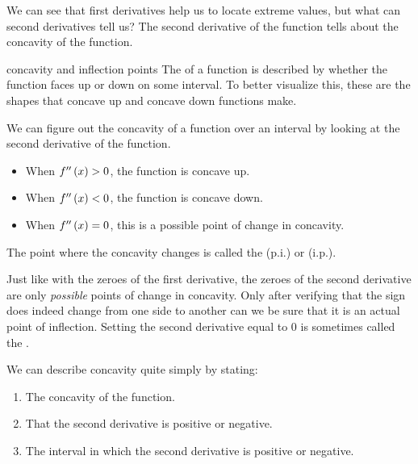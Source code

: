 We can see that first derivatives help us to locate extreme values, but what can second derivatives tell us? The second derivative of the function tells about the concavity of the function.

\begin{definition}{concavity and inflection points}
    The  of a function is described by whether the function faces up or down on some interval. To better visualize this, these are the shapes that concave up and concave down functions make.
    
    \begin{figure}[H]
        \centering
        
    \end{figure}
    
    We can figure out the concavity of a function over an interval by looking at the second derivative of the function.
    
    \begin{itemize}
        \item When \( f^{\prime\prime} \left( x \right) > 0 \), the function is concave up.
        \item When \( f^{\prime\prime} \left( x \right) < 0 \), the function is concave down.
        \item When \( f^{\prime\prime} \left( x \right) = 0 \), this is a possible point of change in concavity.
    \end{itemize}
    
    The point where the concavity changes is called the  (p.i.) or  (i.p.).
\end{definition}

Just like with the zeroes of the first derivative, the zeroes of the second derivative are only \textit{possible} points of change in concavity. Only after verifying that the sign does indeed change from one side to another can we be sure that it is an actual point of inflection. Setting the second derivative equal to \( 0 \) is sometimes called the .

We can describe concavity quite simply by stating:

\begin{enumerate}[label=\alph*.]
    \item The concavity of the function.
    \item That the second derivative is positive or negative.
    \item The interval in which the second derivative is positive or negative.
\end{enumerate}


